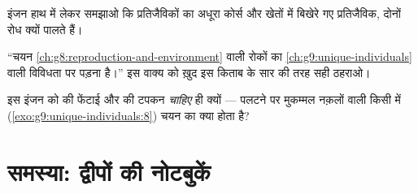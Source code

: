 \begin{exercise}[$\star\star$]\label{exo:g9:how-species-change:10}
इंजन हाथ में लेकर समझाओ कि प्रतिजैविकों का अधूरा कोर्स और खेतों में
बिखेरे गए प्रतिजैविक, दोनों रोध क्यों पालते हैं।
\end{exercise}

\begin{exercise}[$\star\star$]\label{exo:g9:how-species-change:11}
``चयन \cref{ch:g8:reproduction-and-environment} वाली रोकों का
\cref{ch:g9:unique-individuals} वाली विविधता पर पड़ना है।'' इस वाक्य को
ख़ुद इस किताब के सार की तरह सही ठहराओ।
\end{exercise}

\begin{exercise}[$\star\star\star$]\label{exo:g9:how-species-change:12}
इस इंजन को  की फेंटाई और  की टपकन \emph{चाहिए} ही
क्यों ---  पलटने पर मुकम्मल नक़लों वाली किसी  में
(\cref{exo:g9:unique-individuals:8}) चयन का क्या होता है?
\end{exercise}

\section{समस्या: द्वीपों की नोटबुकें}


